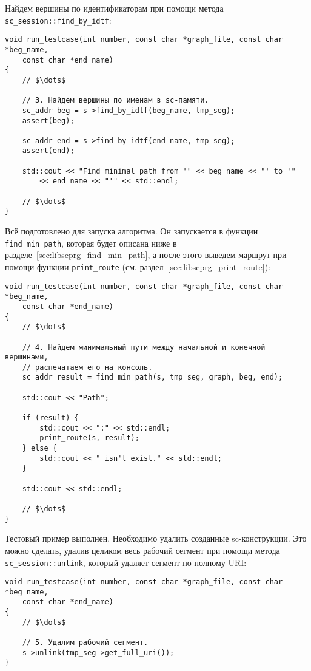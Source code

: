 Найдем вершины по идентификаторам при помощи метода
\lstinline|sc_session::find_by_idtf|:
\begin{lstlisting}[texcl]
void run_testcase(int number, const char *graph_file, const char *beg_name,
    const char *end_name)
{
    // $\dots$

    // 3. Найдем вершины по именам в sc-памяти.
    sc_addr beg = s->find_by_idtf(beg_name, tmp_seg);
    assert(beg);

    sc_addr end = s->find_by_idtf(end_name, tmp_seg);
    assert(end);

    std::cout << "Find minimal path from '" << beg_name << "' to '"
        << end_name << "'" << std::endl;

    // $\dots$
}
\end{lstlisting}

Всё подготовлено для запуска алгоритма. Он запускается в функции
\lstinline|find_min_path|, которая будет описана ниже в
разделе~\ref{sec:libscprg_find_min_path}, а после этого выведем
маршрут при помощи функции \lstinline|print_route|
(см. раздел~\ref{sec:libscprg_print_route}):
\begin{lstlisting}[texcl]
void run_testcase(int number, const char *graph_file, const char *beg_name,
    const char *end_name)
{
    // $\dots$

    // 4. Найдем минимальный пути между начальной и конечной вершинами,
    // распечатаем его на консоль.
    sc_addr result = find_min_path(s, tmp_seg, graph, beg, end);

    std::cout << "Path";

    if (result) {
        std::cout << ":" << std::endl;
        print_route(s, result);
    } else {
        std::cout << " isn't exist." << std::endl;
    }

    std::cout << std::endl;

    // $\dots$
}
\end{lstlisting}

Тестовый пример выполнен. Необходимо удалить созданные
sc-конструкции. Это можно сделать, удалив целиком весь рабочий сегмент
при помощи метода \lstinline|sc_session::unlink|, который удаляет
сегмент по полному URI:
\begin{lstlisting}[texcl]
void run_testcase(int number, const char *graph_file, const char *beg_name,
    const char *end_name)
{
    // $\dots$

    // 5. Удалим рабочий сегмент.
    s->unlink(tmp_seg->get_full_uri());
}
\end{lstlisting}

